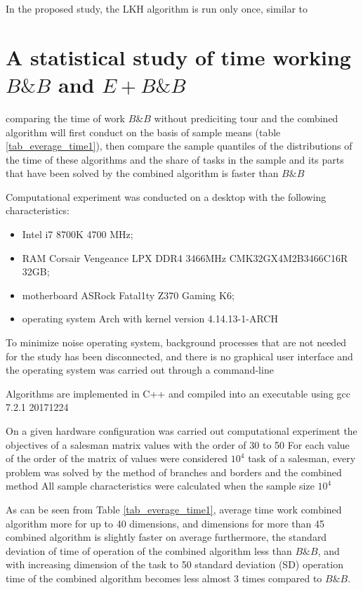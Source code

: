 \documentclass[12pt]{article}
\begin{document}
 In the proposed study, the LKH algorithm is run only once, similar to \cite{BI2018}

 
 
 \section{A statistical study of time working $B\&B$ and $E+B\&B$} 

 comparing the time of work $B\&B$ without prediciting tour and the combined algorithm will first conduct on the basis of sample means (table
\ref{tab_everage_time1}), then compare the sample quantiles of the distributions of the time of these algorithms and the share of tasks in the sample and its parts that have been solved by the combined algorithm is faster than $B\&B$
 
 
 Computational experiment was conducted on a desktop with the following characteristics: 
 \begin{itemize} 
 \item Intel i7 8700K 4700 MHz; 
 \item RAM Corsair Vengeance LPX DDR4 3466MHz CMK32GX4M2B3466C16R 32GB; 
 \item motherboard ASRock Fatal1ty Z370 Gaming K6; 
 \item operating system Arch with kernel version 4.14.13-1-ARCH

 \end{itemize} 
 
 To minimize noise operating system, background processes that are not needed for the study has been disconnected, and there is no graphical user interface and the operating system was carried out through a command-line
 
 Algorithms are implemented in C++ and compiled into an executable using gcc 7.2.1 20171224

 
 On a given hardware configuration was carried out computational experiment the objectives of a salesman matrix values with the order of 30 to 50
For each value of the order of the matrix of values were considered $10^4$ task of a salesman, every problem was solved by the method of branches and borders and the combined method
All sample characteristics were calculated when the sample size $10^4$
 
 
 
 As can be seen from Table
\ref{tab_everage_time1}, average time work combined algorithm more for up to 40 dimensions, and dimensions for more than 45 combined algorithm is slightly faster on average
furthermore, the standard deviation of time of operation of the combined algorithm less than $B\&B$, and with increasing dimension of the task to 50 standard deviation (SD) operation time of the combined algorithm becomes less almost 3 times compared to $B\&B$. 
 
\end{document}
